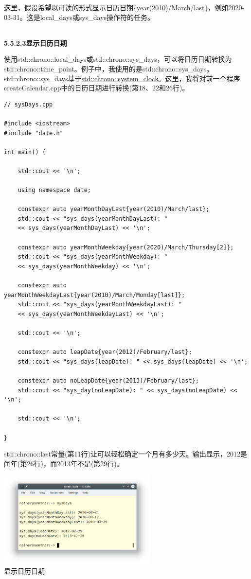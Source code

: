 这里，假设希望以可读的形式显示日历日期\{year(2010)/March/last\}，例如2020-03-31。这是local\_days或sys\_days操作符的任务。

\hspace*{\fill} \\ %
\noindent
\textbf{5.5.2.3\hspace{0.2cm}显示日历日期}

使用std::chrono::local\_days或std::chrono::sys\_days，可以将日历日期转换为std::chrono::time\_point。例子中，我使用的是std::chrono::sys\_days。std::chrono::sys\_days基于\href{https://en.cppreference.com/w/cpp/chrono/system_clock}{std::chrono::system\_clock}。这里，我将对前一个程序createCalendar.cpp中的日历日期进行转换(第18、22和26行)。

\begin{lstlisting}[style=styleCXX]
// sysDays.cpp

#include <iostream>
#include "date.h"

int main() {

	std::cout << '\n';
	
	using namespace date;
	
	constexpr auto yearMonthDayLast{year(2010)/March/last};
	std::cout << "sys_days(yearMonthDayLast): "
	<< sys_days(yearMonthDayLast) << '\n';
	
	constexpr auto yearMonthWeekday{year(2020)/March/Thursday[2]};
	std::cout << "sys_days(yearMonthWeekday): "
	<< sys_days(yearMonthWeekday) << '\n';
	
	constexpr auto yearMonthWeekdayLast{year(2010)/March/Monday[last]};
	std::cout << "sys_days(yearMonthWeekdayLast): "
	<< sys_days(yearMonthWeekdayLast) << '\n';
	
	std::cout << '\n';
	
	constexpr auto leapDate{year(2012)/February/last};
	std::cout << "sys_days(leapDate): " << sys_days(leapDate) << '\n';
	
	constexpr auto noLeapDate{year(2013)/February/last};
	std::cout << "sys_day(noLeapDate): " << sys_days(noLeapDate) << '\n';
	
	std::cout << '\n';

}
\end{lstlisting}

std::chrono::last常量(第11行)让可以轻松确定一个月有多少天。输出显示，2012是闰年(第26行)，而2013年不是(第29行)。

\begin{center}
\includegraphics[width=0.6\textwidth]{content/3/chapter5/images/22.png}\\
显示日历日期
\end{center}

